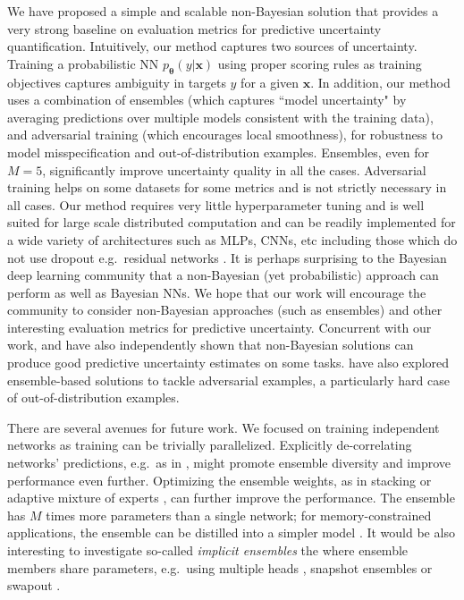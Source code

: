 \documentclass{article}
\newcommand{\bx}{\mathbf{x}}
\newcommand{\btheta}{\mathbf{\theta}}
\begin{document}
{We have proposed a simple and scalable non-Bayesian solution that provides a very strong baseline on evaluation metrics for predictive uncertainty quantification. 
Intuitively, our method captures two sources of uncertainty. Training a probabilistic NN $p_{\btheta}(y|\bx)$ using proper scoring rules as training objectives captures ambiguity in targets $y$ for a given $\bx$. %
In addition, our method uses a combination of ensembles (which captures ``model uncertainty" by averaging predictions over multiple models consistent with the training data), and adversarial training (which encourages local smoothness), for robustness to model misspecification and out-of-distribution examples. Ensembles, even for $M=5$, significantly improve uncertainty quality in all the cases. Adversarial training helps on some datasets for some metrics and is not strictly necessary in all cases. %
Our method requires very little hyperparameter tuning and is well suited for large scale distributed computation and can be readily implemented for a wide variety of architectures such as MLPs, CNNs, etc including those which do not use dropout e.g.~residual networks \citep{resnet}. 
It is perhaps surprising to the Bayesian deep learning community that a non-Bayesian (yet probabilistic) approach can perform as well as Bayesian NNs.   
We hope that our work will encourage the community to consider non-Bayesian approaches (such as ensembles) and other interesting evaluation metrics for predictive uncertainty. Concurrent with our work, \citet{hendrycks2016baseline} and \citet{guo2017calibration} have also independently shown that non-Bayesian solutions can produce good predictive uncertainty estimates on some tasks. \citet{tramer2017ensemble,abbasi2017robustness} have also explored ensemble-based solutions to tackle adversarial examples, a particularly hard case of out-of-distribution examples. 

There are several avenues for future work. We focused on training independent networks as training can be trivially parallelized. Explicitly de-correlating networks' predictions, e.g.~as in \citep{lee2016stochastic}, might promote ensemble diversity and improve performance even further. Optimizing the ensemble weights, as in stacking \citep{stacking} or adaptive mixture of experts \citep{jacobs1991adaptive}, can further improve the performance. 
The ensemble has $M$ times more parameters than a single network; for memory-constrained applications, the ensemble can be distilled into a simpler model \citep{bucilu2006model, distillation}. It would be also interesting to investigate so-called \emph{implicit ensembles} the where ensemble members share parameters, e.g.~using multiple heads \citep{mheads, bootstrapdqn}, snapshot ensembles \citep{snapshotensembles} or swapout 
 \citep{singh2016swapout}. %






}
\end{document}
